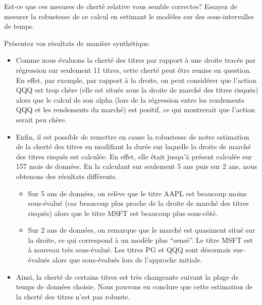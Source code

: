 \documentclass[
]{article}
\providecommand{\tightlist}{%
  \setlength{\itemsep}{0pt}\setlength{\parskip}{0pt}}
\begin{document}
Est-ce que ces mesures de cherté relative vous semble correctes? Essayez
de mesurer la robustesse de ce calcul en estimant le modèles sur des
sous-intervalles de temps.

Présentez vos résultats de manière synthétique.

\begin{itemize}
\item
  Comme nous évaluons la cherté des titres par rapport à une droite
  tracée par régression sur seulement 11 titres, cette cherté peut être
  remise en question. En effet, par exemple, par rapport à la droite, on
  peut considérer que l'action QQQ est trop chère (elle est située sous
  la droite de marché des titres risqués) alors que le calcul de son
  alpha (lors de la régression entre les rendements QQQ et les
  rendements du marché) est positif, ce qui montrerait que l'action
  serait peu chère.
\item
  Enfin, il est possible de remettre en cause la robustesse de notre
  estimation de la cherté des titres en modifiant la durée sur laquelle
  la droite de marché des titres risqués est calculée. En effet, elle
  était jusqu'à présent calculée sur 157 mois de données. En la
  calculant sur seulement 5 ans puis sur 2 ans, nous obtenons des
  résultats différents.

  \begin{itemize}
  \tightlist
  \item
    Sur 5 ans de données, on relève que le titre AAPL est beaucoup moins
    sous-évalué (car beaucoup plus proche de la droite de marché des
    titres risqués) alors que le titre MSFT est beaucoup plus sous-côté.
  \item
    Sur 2 ans de données, on remarque que le marché est quasiment situé
    sur la droite, ce qui correspond à un modèle plus ``sensé''. Le
    titre MSFT est à nouveau très sous-évalué. Les titres PG et QQQ sont
    désormais sur-évalués alors que sous-évalués lors de l'approche
    initiale.
  \end{itemize}
\item
  Ainsi, la cherté de certains titres est très changeante suivant la
  plage de temps de données choisie. Nous pouvons en conclure que cette
  estimation de la cherté des titres n'est pas robuste.
\end{itemize}
\end{document}
